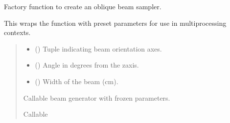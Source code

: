 \documentclass[letterpaper,10pt,english]{sphinxmanual}
\begin{document}

\begin{fulllineitems}
\label{\detokenize{generated/photon_canon.hardware:photon_canon.hardware.create_oblique_beams}}
\pysigstartsignatures
\pysiglinewithargsret
{}
{\sphinxparamcomma {}\sphinxparamcomma {}}
{}
\pysigstopsignatures
\sphinxAtStartPar
Factory function to create an oblique beam sampler.

\sphinxAtStartPar
This wraps the  function with preset parameters for use in multiprocessing contexts.
\begin{quote}\begin{description}
\begin{itemize}
\item {} 
\sphinxAtStartPar
{} (\sphinxstyleliteralemphasis{\sphinxupquote{{[}}}\sphinxstyleliteralemphasis{\sphinxupquote{, }}\sphinxstyleliteralemphasis{\sphinxupquote{{]}}}) \textendash{} Tuple indicating beam orientation axes.

\item {} 
\sphinxAtStartPar
{} () \textendash{} Angle in degrees from the z\sphinxhyphen{}axis.

\item {} 
\sphinxAtStartPar
{} () \textendash{} Width of the beam (cm).

\end{itemize}

\sphinxAtStartPar
Callable beam generator with frozen parameters.

\sphinxAtStartPar
Callable

\end{description}\end{quote}

\end{fulllineitems}
\end{document}
